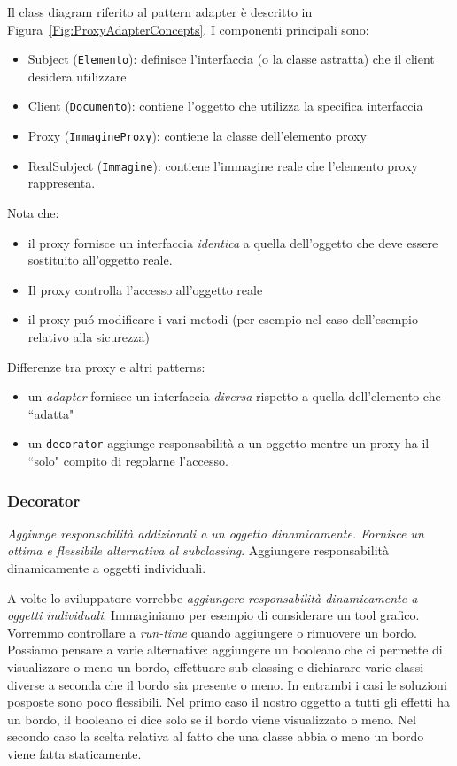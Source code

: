 \documentclass{article}
\begin{document}
\noindent Il class diagram riferito al pattern adapter \`e descritto in Figura~\ref{Fig:ProxyAdapterConcepts}. I componenti principali sono:
\begin{itemize}
\item Subject (\texttt{Elemento}): definisce l'interfaccia (o la classe astratta) che il client desidera utilizzare
\item Client (\texttt{Documento}): contiene l'oggetto che utilizza la specifica interfaccia
\item Proxy (\texttt{ImmagineProxy}): contiene la classe dell'elemento proxy
\item RealSubject (\texttt{Immagine}): contiene l'immagine reale che l'elemento proxy rappresenta.
\end{itemize}

Nota che:
\begin{itemize}
\item il proxy fornisce un interfaccia \emph{identica} a quella dell'oggetto che deve essere sostituito all'oggetto reale. 
\item Il proxy controlla l'accesso all'oggetto reale
\item il proxy pu\'o modificare i vari metodi (per esempio nel caso dell'esempio relativo alla sicurezza)
\end{itemize}

Differenze tra proxy e altri patterns:
\begin{itemize}
\item un \emph{adapter} fornisce un interfaccia \emph{diversa} rispetto a quella dell'elemento che ``adatta"
\item un \texttt{decorator} aggiunge responsabilit\`a a un oggetto mentre un proxy ha il ``solo" compito di regolarne l'accesso.
\end{itemize}

\subsubsection{Decorator}
\begin{framed}
\emph{Aggiunge responsabilit\`a addizionali a un oggetto dinamicamente. Fornisce un ottima e flessibile alternativa al \emph{subclassing}}. Aggiungere responsabilit\`a dinamicamente a oggetti individuali.
\end{framed}

A volte lo sviluppatore vorrebbe \emph{aggiungere responsabilit\`a dinamicamente a oggetti individuali}. Immaginiamo per esempio di considerare un tool grafico. Vorremmo controllare a \emph{run-time} quando aggiungere o rimuovere un bordo. Possiamo pensare a varie alternative: aggiungere un booleano che ci permette di visualizzare o meno un bordo, effettuare sub-classing e dichiarare varie classi diverse a seconda che il bordo sia presente o meno. In entrambi i casi le soluzioni posposte sono poco flessibili. Nel primo caso il nostro oggetto a tutti gli effetti ha un bordo, il booleano ci dice solo se il bordo viene visualizzato o meno. Nel secondo caso la scelta relativa al fatto che una classe abbia o meno un bordo viene fatta staticamente.
\end{document}
